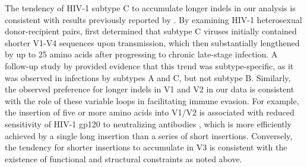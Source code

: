 \documentclass[12pt]{article}
\begin{document}


The tendency of HIV-1 subtype C to accumulate longer indels in our analysis is consistent with results previously reported by \citet{Derdeyn:2004}. %
By examining HIV-1 heterosexual donor-recipient pairs, \citet{Derdeyn:2004} first determined that subtype C viruses initially contained shorter V1-V4 sequences upon transmission, which then substantially lengthened by up to 25 amino acids after progressing to chronic late-stage infection. 
A follow-up study by \citet{Chohan:2005} provided evidence that this trend was subtype-specific, as it was observed in infections by subtypes A and C, but not subtype B.
Similarly, the observed preference for longer indels in V1 and V2 in our data is consistent with the role of these variable loops in facilitating immune evasion.
For example, the insertion of five or more amino acids into V1/V2 is associated with reduced sensitivity of HIV-1 gp120 to neutralizing antibodies \citep{Curlin:2010, Sagar:2006}, which is more efficiently achieved by a single long insertion than a series of short insertions. 
Conversely, the tendency for shorter insertions to accumulate in V3 is consistent with the existence of functional and structural constraints as noted above.


\end{document}
